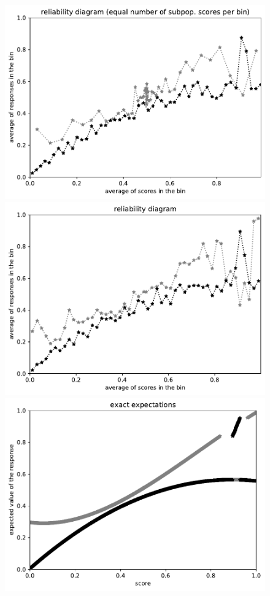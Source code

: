 \documentclass{article}
\newlength{\vertsep}
\newlength{\imsize}
\begin{document}
\begin{figure}
\begin{centering}
\parbox{\imsize}{\includegraphics[width=\imsize]
{../codes/unweighted/10000_7000_50_0/equisamps.pdf}}
\quad\quad
\parbox{\imsize}{\includegraphics[width=\imsize]
{../codes/unweighted/10000_7000_50_0/equiscore.pdf}}

\vspace{\vertsep}

\parbox{\imsize}{\includegraphics[width=\imsize]
{../codes/unweighted/10000_7000_10_0/exact.pdf}}


\end{centering}
\end{figure}
\end{document}
